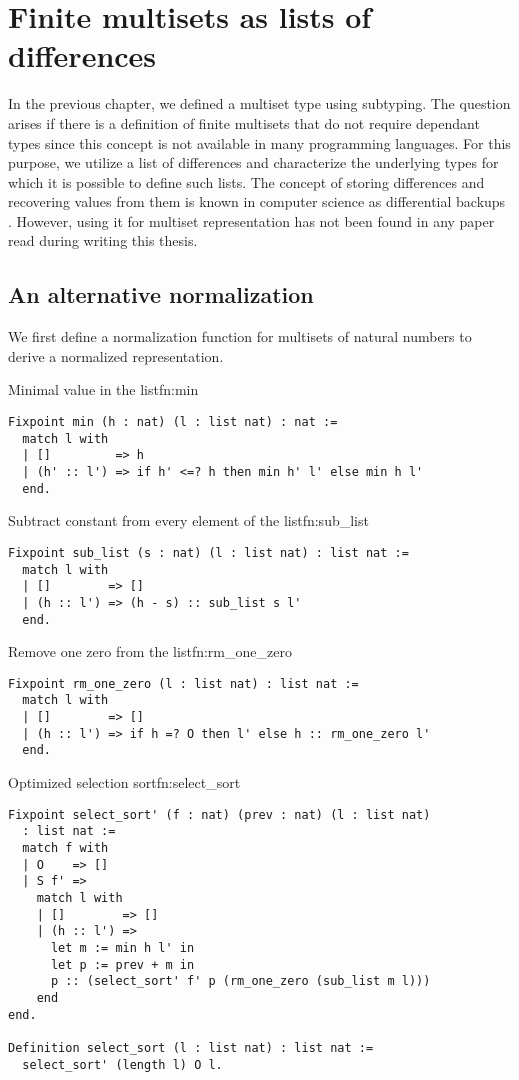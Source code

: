 \section{Finite multisets as lists of differences}
In the previous chapter, we defined a multiset type using subtyping. The question arises if there is a definition of finite multisets that do not require dependant types since this concept is not available in many programming languages. For this purpose, we utilize a list of differences and characterize the underlying types for which it is possible to define such lists. The concept of storing differences and recovering values from them is known in computer science as differential backups \cite{DiffBackups}. However, using it for multiset representation has not been found in any paper read during writing this thesis.
\subsection{An alternative normalization}
We first define a normalization function for multisets of natural numbers to derive a normalized representation.
\begin{func}{Minimal value in the list}{fn:min}
\begin{verbatim}
Fixpoint min (h : nat) (l : list nat) : nat :=
  match l with
  | []         => h
  | (h' :: l') => if h' <=? h then min h' l' else min h l'
  end.
\end{verbatim}
\end{func}
\begin{func}{Subtract constant from every element of the list}{fn:sub_list}
\begin{verbatim}
Fixpoint sub_list (s : nat) (l : list nat) : list nat :=
  match l with
  | []        => []
  | (h :: l') => (h - s) :: sub_list s l'
  end.
\end{verbatim}
\end{func}
\begin{func}{Remove one zero from the list}{fn:rm_one_zero}
\begin{verbatim}
Fixpoint rm_one_zero (l : list nat) : list nat :=
  match l with
  | []        => []
  | (h :: l') => if h =? O then l' else h :: rm_one_zero l'
  end.
\end{verbatim}
\end{func}
\begin{func}[D]{Optimized selection sort}{fn:select_sort}
\begin{verbatim}
Fixpoint select_sort' (f : nat) (prev : nat) (l : list nat) 
  : list nat :=
  match f with
  | O    => []
  | S f' =>
    match l with
    | []        => []
    | (h :: l') => 
      let m := min h l' in
      let p := prev + m in
      p :: (select_sort' f' p (rm_one_zero (sub_list m l)))
    end
end.

Definition select_sort (l : list nat) : list nat :=
  select_sort' (length l) O l.
\end{verbatim}
\end{func}

